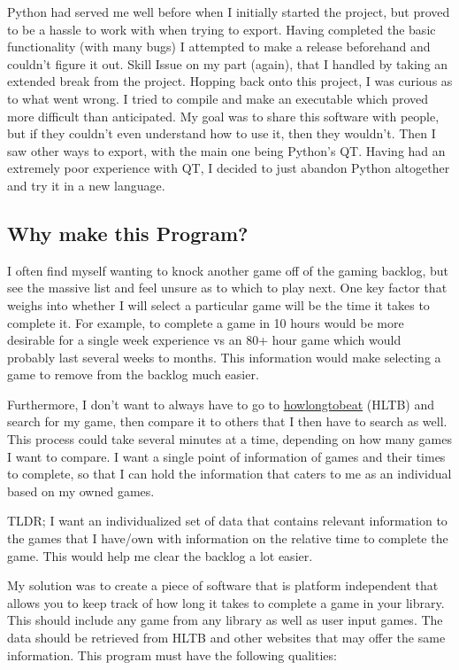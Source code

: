 Python had served me well before when I initially started the
project, but proved to be a hassle to work with when trying to
export. Having completed the basic functionality (with many bugs) I
attempted to make a release beforehand and couldn't figure it out.
Skill Issue on my part (again), that I handled by taking an extended break
from the project.
Hopping back onto this project, I was curious as to what went
wrong. I tried to compile and make an executable which proved more
difficult than anticipated. My goal was to share this software with
people, but if they couldn't even understand how to use it, then
they wouldn't. Then I saw other ways to export, with the main one
being Python's QT.
Having had an extremely poor experience with QT, I decided to just
abandon Python altogether and try it in a new language.

\subsection{Why make this Program?}

I often find myself wanting to knock another game off of the gaming
backlog, but see the massive list and feel unsure as to which to play
next. One key factor that weighs into whether I will select a
particular game will be the time it takes to complete it. For
example, to complete a game in 10 hours would be more desirable for a
single week experience vs an 80+ hour game which would probably last
several weeks to months. This information would make selecting a game
to remove from the backlog much easier.

Furthermore, I don't want to always have to go to
\href{https://howlongtobeat.com/}{howlongtobeat} (HLTB) and search for my game,
then compare it to others that I then have to search as well. This
process could take several minutes at a time, depending on how many
games I want to compare. I want a single point of information of
games and their times to complete, so that I can hold the information
that caters to me as an individual based on my owned games.

TLDR;
I want an individualized set of data that contains relevant
information to the games that I have/own with information on the
relative time to complete the game. This would help me clear
the backlog a lot easier.

My solution was to create a piece of software that is platform
independent that allows you to keep track of how long it takes to
complete a game in your library. This should include any game from
any library as well as user input games. The data should be retrieved
from HLTB and other websites that may offer the same information.
This program must have the following qualities:

